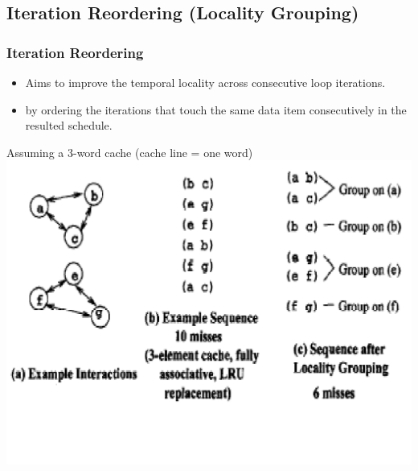\documentclass{beamer}
\newcommand{\emphh}[1]{\textcolor{CosGreen}{ #1}}
\begin{document}
\subsection{Iteration Reordering (Locality Grouping)}


\begin{frame}[fragile,t]
  \frametitle{Iteration Reordering}

\begin{itemize}
    \item Aims to improve the \emphh{temporal locality} across 
            consecutive loop iterations.
    \item by ordering the iterations that touch the same
            data item consecutively in the resulted schedule.
\end  {itemize}

Assuming a 3-word cache (cache line = one word)
\includegraphics[width=54ex]{Figures/CacheMissesEg2}
 
\end{frame}
\end{document}
